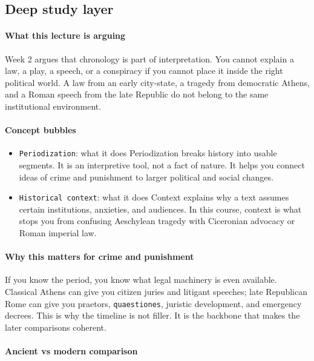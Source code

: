 \documentclass[11pt]{article}
\begin{document}
\subsection{Deep study layer}

\paragraph{What this lecture is arguing}

Week 2 argues that chronology is part of interpretation. You cannot explain a law, a play, a speech, or a conspiracy if you cannot place it inside the right political world. A law from an early city-state, a tragedy from democratic Athens, and a Roman speech from the late Republic do not belong to the same institutional environment.

\paragraph{Concept bubbles}

\begin{itemize}
\item \texttt{Periodization}: what it does Periodization breaks history into usable segments. It is an interpretive tool, not a fact of nature. It helps you connect ideas of crime and punishment to larger political and social changes.
\item \texttt{Historical context}: what it does Context explains why a text assumes certain institutions, anxieties, and audiences. In this course, context is what stops you from confusing Aeschylean tragedy with Ciceronian advocacy or Roman imperial law.
\end{itemize}

\paragraph{Why this matters for crime and punishment}

If you know the period, you know what legal machinery is even available. Classical Athens can give you citizen juries and litigant speeches; late Republican Rome can give you praetors, \texttt{quaestiones}, juristic development, and emergency decrees. This is why the timeline is not filler. It is the backbone that makes the later comparisons coherent.

\paragraph{Ancient vs modern comparison}
\end{document}
